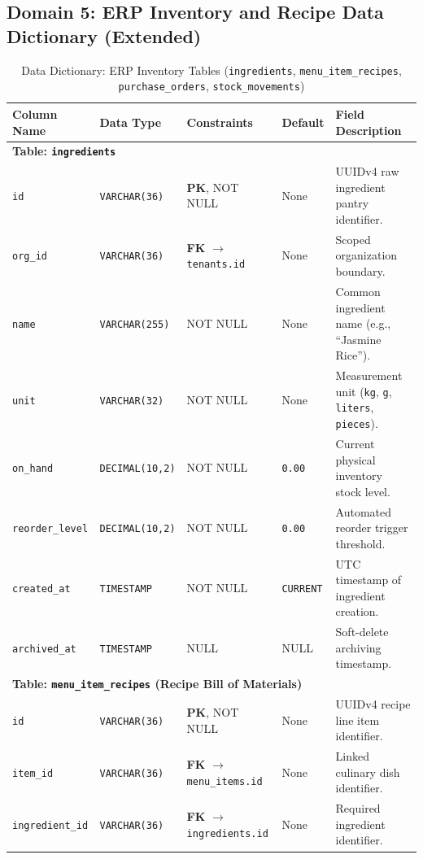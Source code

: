 \subsection{Domain 5: ERP Inventory and Recipe Data Dictionary (Extended)}

\begin{table}[htbp]
\centering
\caption{Data Dictionary: ERP Inventory Tables (\texttt{ingredients}, \texttt{menu\_item\_recipes}, \texttt{purchase\_orders}, \texttt{stock\_movements})}
\label{tab:dict_inventory}
\small
\begin{tabularx}{\textwidth}{llp{3.2cm}lX}
\toprule
\textbf{Column Name} & \textbf{Data Type} & \textbf{Constraints} & \textbf{Default} & \textbf{Field Description} \\
\midrule
\multicolumn{5}{l}{\textbf{Table: \texttt{ingredients}}} \\
\texttt{id} & \texttt{VARCHAR(36)} & \textbf{PK}, NOT NULL & None & UUIDv4 raw ingredient pantry identifier. \\
\texttt{org\_id} & \texttt{VARCHAR(36)} & \textbf{FK} $\to$ \texttt{tenants.id} & None & Scoped organization boundary. \\
\texttt{name} & \texttt{VARCHAR(255)} & NOT NULL & None & Common ingredient name (e.g., ``Jasmine Rice''). \\
\texttt{unit} & \texttt{VARCHAR(32)} & NOT NULL & None & Measurement unit (\texttt{kg}, \texttt{g}, \texttt{liters}, \texttt{pieces}). \\
\texttt{on\_hand} & \texttt{DECIMAL(10,2)}& NOT NULL & \texttt{0.00} & Current physical inventory stock level. \\
\texttt{reorder\_level}& \texttt{DECIMAL(10,2)}& NOT NULL & \texttt{0.00} & Automated reorder trigger threshold. \\
\texttt{created\_at} & \texttt{TIMESTAMP} & NOT NULL & \texttt{CURRENT} & UTC timestamp of ingredient creation. \\
\texttt{archived\_at} & \texttt{TIMESTAMP} & NULL & NULL & Soft-delete archiving timestamp. \\
\midrule
\multicolumn{5}{l}{\textbf{Table: \texttt{menu\_item\_recipes} (Recipe Bill of Materials)}} \\
\texttt{id} & \texttt{VARCHAR(36)} & \textbf{PK}, NOT NULL & None & UUIDv4 recipe line item identifier. \\
\texttt{item\_id} & \texttt{VARCHAR(36)} & \textbf{FK} $\to$ \texttt{menu\_items.id} & None & Linked culinary dish identifier. \\
\texttt{ingredient\_id}& \texttt{VARCHAR(36)}& \textbf{FK} $\to$ \texttt{ingredients.id}& None & Required ingredient identifier. \\

\end{tabularx}
\end{table}
